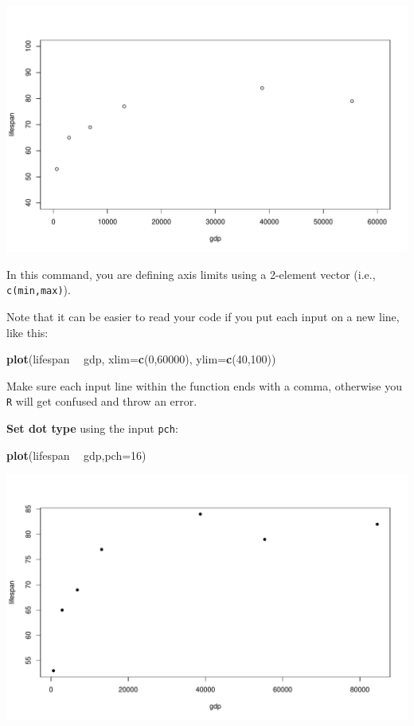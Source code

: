 \documentclass[
]{book}
\newenvironment{Shaded}{\begin{snugshade}}{\end{snugshade}}
\newcommand{\DataTypeTok}[1]{\textcolor[rgb]{0.13,0.29,0.53}{#1}}
\newcommand{\DecValTok}[1]{\textcolor[rgb]{0.00,0.00,0.81}{#1}}
\newcommand{\KeywordTok}[1]{\textcolor[rgb]{0.13,0.29,0.53}{\textbf{#1}}}
\newcommand{\NormalTok}[1]{#1}
\newcommand{\OperatorTok}[1]{\textcolor[rgb]{0.81,0.36,0.00}{\textbf{#1}}}
\newcommand{\StringTok}[1]{\textcolor[rgb]{0.31,0.60,0.02}{#1}}
\begin{document}
\includegraphics{figures/unnamed-chunk-87-1.pdf}

In this command, you are defining axis limits using a 2-element vector (i.e., \texttt{c(min,max)}).

Note that it can be easier to read your code if you put each input on a new line, like this:

\begin{Shaded}
\begin{Highlighting}[]
\KeywordTok{plot}\NormalTok{(lifespan }\OperatorTok{~}\StringTok{ }\NormalTok{gdp,}
     \DataTypeTok{xlim=}\KeywordTok{c}\NormalTok{(}\DecValTok{0}\NormalTok{,}\DecValTok{60000}\NormalTok{),}
     \DataTypeTok{ylim=}\KeywordTok{c}\NormalTok{(}\DecValTok{40}\NormalTok{,}\DecValTok{100}\NormalTok{))}
\end{Highlighting}
\end{Shaded}

Make sure each input line within the function ends with a comma, otherwise you \texttt{R} will get confused and throw an error.

\textbf{Set dot type} using the input \texttt{pch}:

\begin{Shaded}
\begin{Highlighting}[]
\KeywordTok{plot}\NormalTok{(lifespan }\OperatorTok{~}\StringTok{ }\NormalTok{gdp,}\DataTypeTok{pch=}\DecValTok{16}\NormalTok{)}
\end{Highlighting}
\end{Shaded}

\includegraphics{figures/unnamed-chunk-89-1.pdf}
\end{document}
